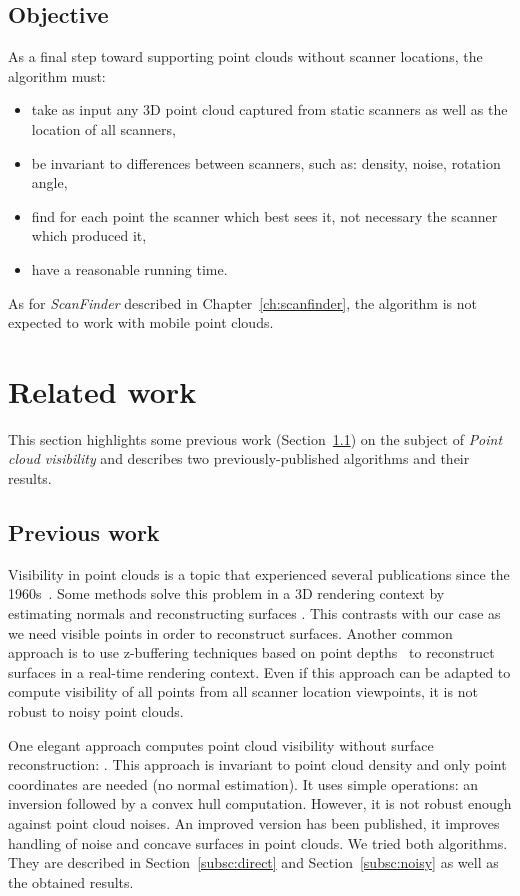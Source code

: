 \subsection{Objective}
\label{subsc:vis-objective}
As a final step toward supporting point clouds without scanner locations, the algorithm must:
\begin{itemize}
\item take as input any 3D point cloud captured from static scanners as well as the location of all scanners,
\item be invariant to differences between scanners, such as: density, noise, rotation angle,
\item find for each point the scanner which best sees it, not necessary the scanner which produced it,
\item have a reasonable running time.
\end{itemize}

As for \emph{ScanFinder} described in Chapter~\ref{ch:scanfinder}, the algorithm is not expected to work with mobile point clouds.


\section{Related work}
\label{sc:related-visibility}
This section highlights some previous work (Section~\ref{subsc:visibility-prev}) on the subject of \emph{Point cloud visibility} and describes two previously-published algorithms and their results.


\subsection{Previous work}
\label{subsc:visibility-prev}
Visibility in point clouds is a topic that experienced several publications since the 1960s~\cite{appel, sutherland, funkhouser, greene, bittner}. Some methods solve this problem in a 3D rendering context by estimating normals and reconstructing surfaces \cite{sainz1, sainz2, wald, wu}. This contrasts with our case as we need visible points in order to reconstruct surfaces. Another common approach is to use z-buffering techniques based on point depths~\cite{dachsbacher} to reconstruct
surfaces in a real-time rendering context. Even if this approach can be adapted to compute visibility of all points from all scanner location viewpoints, it is not robust to noisy point clouds.

One elegant approach computes point cloud visibility without surface reconstruction: \cite{vis1}. This approach is invariant to point cloud density and only point coordinates are needed (no normal estimation). It uses simple operations: an inversion followed by a convex hull computation. However, it is not robust enough against point cloud noises. An improved version \cite{vis2} has been published, it improves handling of noise and concave surfaces in point clouds.
We tried both algorithms. They are described in Section~\ref{subsc:direct} and Section~\ref{subsc:noisy} as well as the obtained results.


